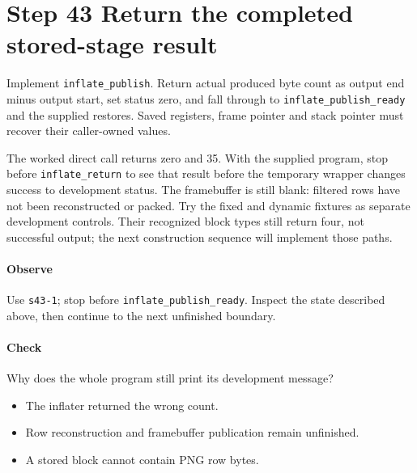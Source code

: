 \section{Step 43 Return the completed stored-stage result}\label{png-inflate-s43}
Implement \texttt{inflate\_publish}. Return actual produced byte count as output end minus output start, set status zero, and fall through to \texttt{inflate\_publish\_ready} and the supplied restores. Saved registers, frame pointer and stack pointer must recover their caller-owned values.

The worked direct call returns zero and 35. With the supplied program, stop before \texttt{inflate\_return} to see that result before the temporary wrapper changes success to development status. The framebuffer is still blank: filtered rows have not been reconstructed or packed. Try the fixed and dynamic fixtures as separate development controls. Their recognized block types still return four, not successful output; the next construction sequence will implement those paths.

\paragraph{Observe} Use \texttt{s43-1}; stop before \texttt{inflate\_publish\_ready}. Inspect the state described above, then continue to the next unfinished boundary.

\paragraph{Check} Why does the whole program still print its development message?
\begin{itemize}
  \item[A.] The inflater returned the wrong count.
  \item[B.] Row reconstruction and framebuffer publication remain unfinished.
  \item[C.] A stored block cannot contain PNG row bytes.
\end{itemize}
